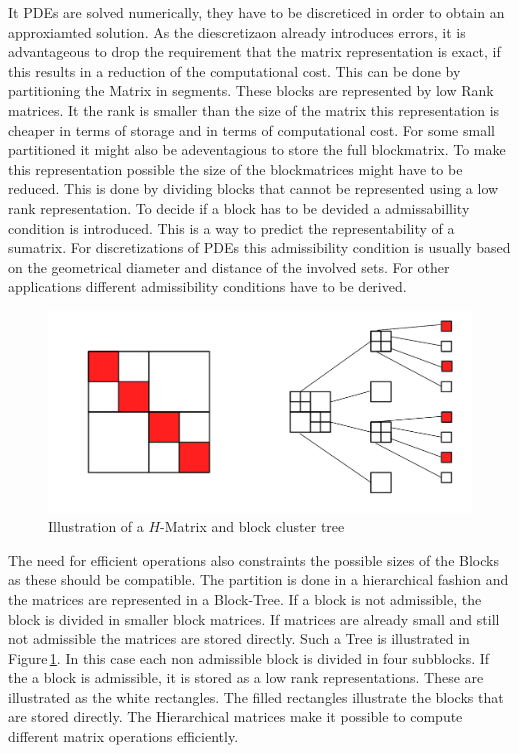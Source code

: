\documentclass[doctype=mastersthesis,BCOR=15mm,biblatex]{ldvbook}%
\begin{document}
It PDEs are solved numerically, they have to be discreticed in order to obtain an approxiamted solution.
As the diescretizaon already introduces errors, it is advantageous to drop the requirement that the matrix representation is exact, if this results in a reduction of the computational cost.
This can be done by partitioning the Matrix in segments. These blocks are represented by low Rank matrices. It the rank is smaller than the size of the matrix this representation is cheaper in terms of storage and in terms of computational cost.
For some small partitioned it might also be adeventagious to store the full blockmatrix.
To make this representation possible the size of the blockmatrices might have to be reduced.
This is done by dividing blocks that cannot be represented using a low rank representation.
To decide if a block has to be devided a admissabillity condition is introduced.
This is a way to predict the representability of a sumatrix.
For discretizations of PDEs this admissibility condition is usually based on the geometrical diameter and distance of the involved sets.
For other applications different admissibility conditions have to be derived.


\begin{figure}
	\centering
	\includegraphics[width=0.7\linewidth]{diagrams/Struktur_H-matrix}
	\caption{Illustration of a $H$-Matrix and block cluster tree}
	\label{fig:strukturh-matrix}
\end{figure}


The need for efficient operations also constraints the possible sizes of the Blocks as these should be compatible.
The partition is done in a hierarchical fashion and the matrices are represented in a Block-Tree. 
If a block is not admissible, the block is divided in smaller block matrices.
If matrices are already small and still not admissible the matrices are stored directly.
Such a Tree is illustrated in Figure\,\ref*{fig:strukturh-matrix}.
In this case each non admissible block is divided in four subblocks. 
If the a block is admissible, it is stored as a low rank representations.
These are illustrated as the white rectangles.
The filled rectangles illustrate the blocks that are stored directly.
The Hierarchical matrices make it possible to compute different matrix operations efficiently.
\end{document}
